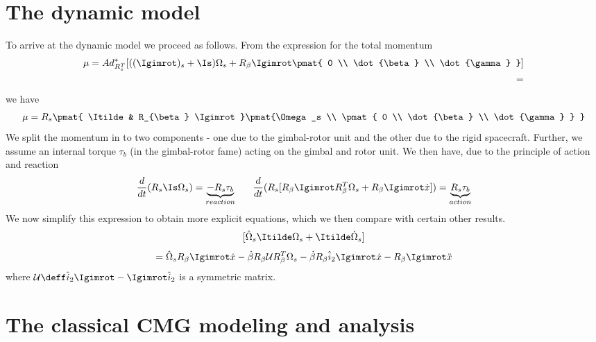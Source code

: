 \documentclass[11pt]{article}                %
\begin{document}
\section{The dynamic model}
%
		To arrive at the dynamic model we proceed as follows.
		From the expression for the total momentum 
	       \begin{align}
	       \mu = Ad_{R_s^T}^* [ ((\Igimrot)_s + \Is) \Omega_s + R_{\beta} \Igimrot \pmat{ 0  \\  \dot{\beta}
	                                                      \\  \dot{\gamma} }   ]   \\
	                = 
	       \end{align}
	       we have
	       \begin{align}  \mu = R_s \pmat{ \Itilde & R_{\beta} \Igimrot}  \pmat{\Omega_s 
	       \\  \pmat{ 0  \\  \dot{\beta}  \\  \dot{\gamma} }  }
	       \end{align}
	       We split the momentum in to two components - one due to the gimbal-rotor unit and the other due to
	       the rigid spacecraft. Further, we assume an internal torque $\tau_b$ (in the gimbal-rotor fame)
	       acting on the gimbal and rotor unit. We then have, due to the principle of action and
	       reaction
	       \begin{align}
	       	\frac{d}{dt} (R_s \Is \Omega_s) = \underbrace{- R_s \tau_b}_{reaction}
		\;\;\;\; \;\;
		       \frac{d}{dt} ( R_s [ R_{\beta} \Igimrot R_{\beta}^T \Omega_s + R_{\beta} \Igimrot \dot{x} ] )
		       = \underbrace{R_s \tau_b}_{action}
	       \end{align}  
		We now simplify this expression to obtain more explicit equations, which we then 
		compare with certain other results.
		\[
		[ \hat{\Omega}_s \Itilde \Omega_s  +  \Itilde \dot{\Omega}_s ] 
		\]
		\begin{align}
		= \hat{\Omega}_s R_{\beta} \Igimrot \dot{x} - \dot{\beta} R_{\beta} {\cal U} R_{\beta}^T
		\Omega_s - \dot{\beta} R_{\beta} \hat{i}_2 \Igimrot \dot{x} - R_{\beta} \Igimrot 
		\ddot{x}
		\end{align}
		where ${\cal U} \deff \hat{i}_2 \Igimrot - \Igimrot \hat{i}_2$ is a symmetric matrix.
		
		
\section{The classical CMG modeling and analysis}		
\end{document}
